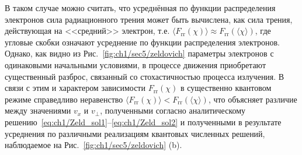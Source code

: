 В таком случае можно считать, что усреднённая по функции распределения электронов сила радиационного трения может быть вычислена, как сила трения, действующая на <<средний>> электрон, т.е. $\langle F_\mathrm{rr} (\chi) \rangle \approx F_\mathrm{rr}(\langle\chi\rangle)$, где угловые скобки означают усреднение по функции распределения электронов.
Однако, как видно из Рис.~\ref{fig:ch1/sec5/zeldovich} параметры электронов с одинаковыми начальными условиями, в процессе движения приобретают существенный разброс, связанный со стохастичностью процесса излучения.
В связи с этим и характером зависимости $F_\mathrm{rr}(\chi)$ в существенно квантовом режиме справедливо неравенство $\langle F_\mathrm{rr} (\chi) \rangle < F_\mathrm{rr}(\langle\chi\rangle)$, что объясняет различие между значениями $v_x$ и $v_\perp$, полученными согласно аналитическому решению~\eqref{eq:ch1/Zeld_sol1}--\eqref{eq:ch1/Zeld_sol2} и полученными в результате усреднения по различными реализациям квантовых численных решений, наблюдаемое на Рис.~\ref{fig:ch1/sec5/zeldovich} (b).

